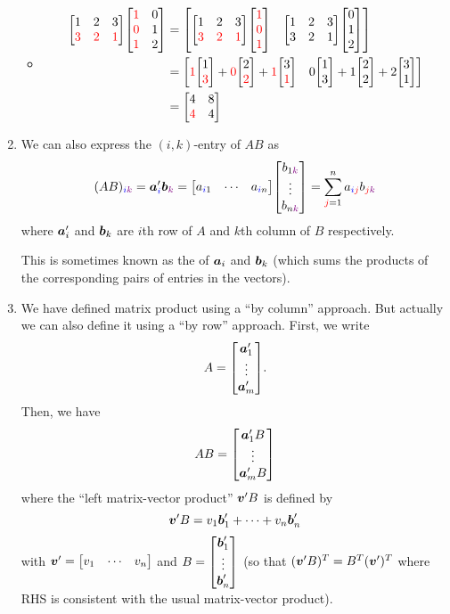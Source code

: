 \begin{enumerate}
\begin{itemize}
\item \begin{align*}
\mqty[1&2&3\\ \rc{3}&\rc{2}&\rc{1}]\mqty[\rc{1}&0\\ \rc{0}&1\\ \rc{1}&2]
&=\mqty[
\mqty[1&2&3\\ \rc{3}&\rc{2}&\rc{1}]\mqty[\rc{1}\\ \rc{0}\\ \rc{1}]
&\mqty[1&2&3\\ 3&2&1]\mqty[0\\ 1\\ 2]
]\\
&=\mqty[
\rc{1}\mqty[1\\ \rc{3}]+\rc{0}\mqty[2\\ \rc{2}]+\rc{1}\mqty[3\\ \rc{1}]
&0\mqty[1\\ 3]+1\mqty[2\\ 2]+2\mqty[3\\ 1]
]\\
&=\mqty[4&8\\ \rc{4}&4]
\end{align*}
\end{itemize}
\item We can also express the \((i,k)\)-entry of \(AB\) as
\[
(AB)_{\blc{i}\vc{k}}=\vect{a}_{\blc{i}}'\vect{b}_{\vc{k}}
=\mqty[a_{\blc{i}1}&\cdots&a_{\blc{i}n}]
\mqty[b_{1\vc{k}}\\\vdots\\b_{n\vc{k}}]
=\sum_{\rc{j}=1}^{n}a_{\blc{i}\rc{j}}b_{\rc{j}\vc{k}}
\]
where \(\vb*{a}_{i}'\) and \(\vb*{b}_{k}\) are \(i\)th row of \(A\) and
\(k\)th column of \(B\) respectively. \begin{note}
This is sometimes known as the  of \(\vb*{a}_{i}\) and
\(\vb*{b}_{k}\) (which sums the products of the corresponding pairs of entries
in the vectors).
\end{note}

\item We have defined matrix product using a ``by column'' approach. But
actually we can also define it using a ``by row'' approach. First, we write
\[
A=\mqty[\vect{a}_{1}'\\ \vdots\\ \vect{a}_{m}'].
\]
Then, we have
\[
AB=\mqty[\vect{a}_{1}'B\\ \vdots\\ \vect{a}_{m}'B]
\]
where the ``left matrix-vector product'' \(\vb*{v}'B\) is defined by
\[
\vb*{v}'B=v_1\vb*{b}_{1}'+\dotsb+v_n\vb*{b}_{n}'
\]
with \(\vect{v}'=\mqty[v_1&\cdots&v_n]\) and \(\displaystyle
B=\mqty[\vect{b}_{1}'\\ \vdots\\ \vect{b}_{n}']\) (so that
\((\vb*{v}'B)^{T}=B^T(\vb*{v}')^T\) where RHS is consistent with the usual
matrix-vector product).


\end{enumerate}
